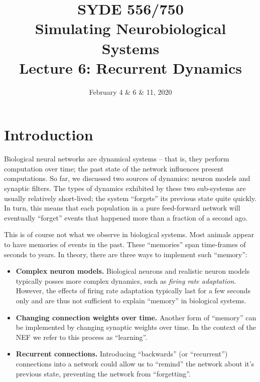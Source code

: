 \documentclass[10pt,letterpaper,oneside]{article}
\date{February 4 \& 6 \& 11, 2020}
\title{SYDE 556/750 \\ Simulating Neurobiological Systems \\ Lecture 6: Recurrent Dynamics}
\begin{document}

\section{Introduction}


Biological neural networks are dynamical systems -- that is, they perform computation over time; the past state of the network influences present computations. So far, we discussed two sources of dynamics: neuron models and synaptic filters. The types of dynamics exhibited by these two sub-systems are usually relatively short-lived; the system \enquote{forgets} its previous state quite quickly. In turn, this means that each population in a pure feed-forward network will eventually \enquote{forget} events that happened more than a fraction of a second ago.


This is of course not what we observe in biological systems. Most animals appear to have memories of events in the past. These \enquote{memories} span time-frames of seconds to years. In theory, there are three ways to implement such \enquote{memory}:
\begin{itemize}
	\item \textbf{Complex neuron models.} Biological neurons and realistic neuron models typically posses more complex dynamics, such as \emph{firing rate adaptation}. However, the effects of firing rate adaptation typically last for a few seconds only and are thus not sufficient to explain \enquote{memory} in biological systems.
	\item \textbf{Changing connection weights over time.} Another form of \enquote{memory} can be implemented by changing synaptic weights over time. In the context of the NEF we refer to this process as \enquote{learning}.
	\item \textbf{Recurrent connections.} Introducing \enquote{backwards} (or \enquote{recurrent}) connections into a network could allow us to \enquote{remind} the network about it's previous state, preventing the network from \enquote{forgetting}.
\end{itemize}
\end{document}
